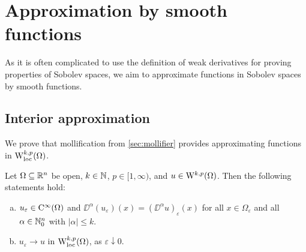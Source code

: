 \chapter{Approximation by smooth functions}

As it is often complicated to use the definition of weak derivatives for proving properties of Sobolev spaces, we aim to approximate functions in Sobolev spaces by smooth functions.

\section{Interior approximation}

We prove that mollification from \ref{sec:mollifier} provides approximating functions in $\mathrm{W}_{\operatorname{loc}}^{k,p}(\Omega)$.

\begin{thm}\label{thm:interiorApproximation}
  Let $\Omega \subseteq \mathbb{R}^n$ be open, $k \in \mathbb{N}$, $p \in [1,\infty)$, and $u \in \mathrm{W}^{k,p}(\Omega)$.
    Then the following statements hold:
    \begin{enumerate}[a)]
      \item $u_\varepsilon \in \mathrm{C}^\infty(\Omega)$ and $\DD^\alpha(u_\varepsilon)(x) = (\DD^\alpha u)_\varepsilon(x)$ for all $ x \in \Omega_\varepsilon$ and all $\alpha \in \mathbb{N}_0^n$ with $|\alpha| \leq k$.
      \item $u_\varepsilon \to u$ in $\mathrm{W}_{\operatorname{loc}}^{k,p}(\Omega)$, as $\varepsilon \downarrow 0$.
    \end{enumerate}
\end{thm}

